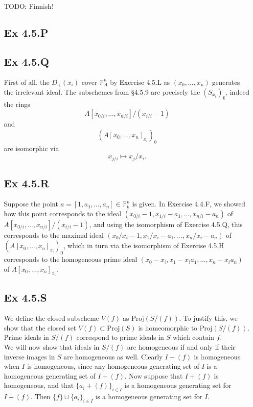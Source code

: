 \documentclass{article}
\theoremstyle{definition}
\renewcommand{\P}{\mathbb{P}}
\newcommand{\Proj}{\text{Proj}}
\begin{document}
TODO: Finnish!

\subsection*{Ex 4.5.P}

\subsection*{Ex 4.5.Q}

First of all, the $D_{+}(x_i)$ cover $\P^{n}_A$ by Exercise 4.5.L as $(x_0,
	\ldots, x_n)$ generates the irrelevant ideal. The subschemes from §4.5.9 are
precisely the $(S_{x_i})_{0}$, indeed the rings
\[
	A[x_{0/i}, \ldots, x_{n/i}]/(x_{i/i} - 1)
\]
and
\[
	(A[x_0, \ldots, x_n]_{x_i})_{0}
\]
are isomorphic via
\[
	x_{j/i} \mapsto x_{j}/x_{i}.
\]

\subsection*{Ex 4.5.R}

Suppose the point $a = [1, a_1, \ldots, a_n] \in \P^{n}_{k}$ is given. In
Exercise 4.4.F, we showed how this point corresponds to the ideal $(x_{0/i} -
	1, x_{1/i} - a_1, \ldots, x_{n/i} - a_n)$ of $A[x_{0/i}, \ldots,
			x_{n/i}]/(x_{i/i} - 1)$, and using the isomorphism of Exercise 4.5.Q, this
corresponds to the maximal ideal $(x_0/x_i - 1, x_1/x_i - a_1, \ldots, x_n/x_i
	- a_n)$ of $(A[x_0, \ldots, x_n]_{x_i})_{0}$, which in turn via the isomorphism
of Exercise 4.5.H corresponds to the homogeneous prime ideal $(x_0 - x_i, x_1 -
	x_i a_1, \ldots, x_n - x_i a_n)$ of $A[x_{0}, \ldots, x_n]_{x_i}$.

\subsection*{Ex 4.5.S}

We define the closed subscheme $V(f)$ as $\Proj(S/(f))$. To justify this, we show
that the closed set $V(f) \subset \Proj(S)$ is homeomorphic to $\Proj(S/(f))$. \\

Prime ideals in $S/(f)$ correspond to prime ideals in $S$ which contain $f$. \\

We will now show that ideals in $S/(f)$ are homogeneous if and only if their
inverse images in $S$ are homogeneous as well. Clearly $I + (f)$ is homogeneous
when $I$ is homogeneous, since any homogeneous generating set of $I$ is a
homogeneous generating set of $I + (f)$. Now suppose that $I + (f)$ is
homogeneous, and that $\{a_i + (f)\}_{i \in I}$ is a homogeneous generating set
for $I + (f)$. Then $\{f\} \cup \{a_i\}_{i \in I}$ is a homogeneous generating
set for $I$. \\
\end{document}
